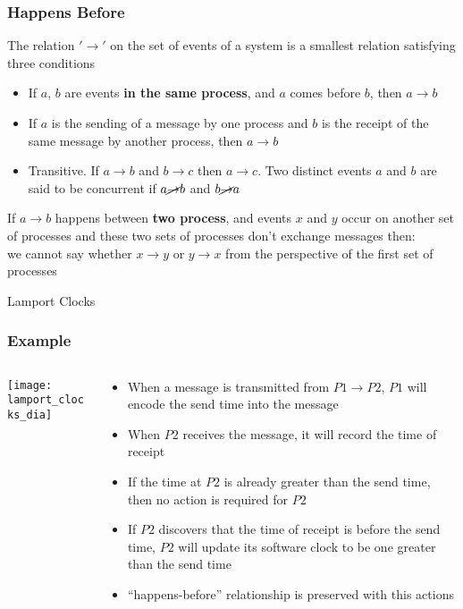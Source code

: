 \documentclass[aspectratio=169, 15pt,usenames,dvipsnames]{beamer}
\begin{document}
	\begin{gdblank}
		\frametitle{Happens Before}
		The relation $'\rightarrow'$ on the set of events of a system is a smallest relation satisfying three conditions
		\begin{itemize}
			\item If $a$, $b$ are events \textbf{in the same process}, and $a$ comes before $b$, then $a\rightarrow b$ 
			\item If $a$ is the sending of a message by one process and $b$ is the receipt of the same message by another process, then $a\rightarrow b$
			\item Transitive. If $a\rightarrow b$ and $b\rightarrow c$ then $a\rightarrow c$. Two distinct events $a$ and $b$ are said to be concurrent if $a\cancel{\rightarrow} b$ and $b\cancel{\rightarrow} a$
		\end{itemize}				
		\par
		If $a\rightarrow b$ happens between \textbf{two process}, and events $x$ and $y$ occur on another set of processes and these two sets of processes don’t exchange messages then:\\
		we cannot say whether $x\rightarrow y$ or $y\rightarrow x$ from the perspective of the first set of processes
	\end{gdblank}
	\begin{gdblank}
		\centering\LARGE
		Lamport Clocks
	\end{gdblank}
	\begin{gdblank}
		\frametitle{Example}
		\note{
		транзакции
		}
		\begin{columns}
			\begin{column}{0.5\textwidth}
				\texttt{[image: lamport\_clocks\_dia]}			
			\end{column}
			\begin{column}{0.5\textwidth}
				\begin{itemize}
					\item When a message is transmitted from $P1 \rightarrow P2$, $P1$ will encode the send time into the message
					      \pause
					\item When $P2$ receives the message, it will record the time of receipt
					      \pause
					\item If the time at $P2$ is already greater than the send time, then no action is required for $P2$
					      \pause
					\item If $P2$ discovers that the time of receipt is before the send time, $P2$ will update its software clock to be one greater than the send time
					      \pause
					\item “happens-before” relationship is preserved with this actions
				\end{itemize}
			\end{column}	
		\end{columns}
	\end{gdblank}	
\end{document}
